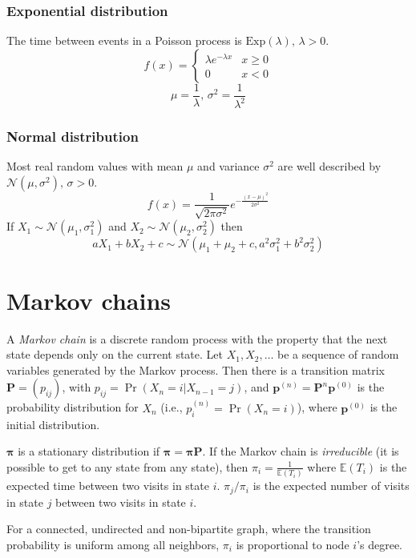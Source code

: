 \subsubsection{Exponential distribution}
The time between events in a Poisson process is $\textrm{Exp}(\lambda),\,\lambda>0$.
\[f(x) = \left\{
\begin{array}{cl}
\lambda e^{-\lambda x} & x\geq0\\
0 & x<0
\end{array}\right.\]
\[\mu=\frac{1}{\lambda},\,\sigma^2=\frac{1}{\lambda^2}\]

\subsubsection{Normal distribution}
Most real random values with mean $\mu$ and variance $\sigma^2$ are well described by $\mathcal{N}(\mu,\sigma^2),\,\sigma>0$.
\[ f(x) = \frac{1}{\sqrt{2\pi\sigma^2}}e^{-\frac{(x-\mu)^2}{2\sigma^2}} \]
If $X_1 \sim \mathcal{N}(\mu_1,\sigma_1^2)$ and $X_2 \sim \mathcal{N}(\mu_2,\sigma_2^2)$ then
\[ aX_1 + bX_2 + c \sim \mathcal{N}(\mu_1+\mu_2+c,a^2\sigma_1^2+b^2\sigma_2^2) \]

\section{Markov chains}
A \emph{Markov chain} is a discrete random process with the property that the next state depends only on the current state.
Let $X_1,X_2,\ldots$ be a sequence of random variables generated by the Markov process.
Then there is a transition matrix $\mathbf{P} = (p_{ij})$, with $p_{ij} = \Pr(X_n = i | X_{n-1} = j)$,
and $\mathbf{p}^{(n)} = \mathbf P^n \mathbf p^{(0)}$ is the probability distribution for $X_n$ (i.e., $p^{(n)}_i = \Pr(X_n = i)$),
where $\mathbf{p}^{(0)}$ is the initial distribution.

$\mathbf{\pi}$ is a stationary distribution if $\mathbf{\pi} = \mathbf{\pi P}$.
If the Markov chain is \emph{irreducible} (it is possible to get to any state from any state),
then $\pi_i = \frac{1}{\mathbb{E}(T_i)}$ where $\mathbb{E}(T_i)$  is the expected time between two visits in state $i$.
$\pi_j/\pi_i$ is the expected number of visits in state $j$ between two visits in state $i$.

For a connected, undirected and non-bipartite graph, where the transition probability is uniform among all neighbors, $\pi_i$ is proportional to node $i$'s degree.

